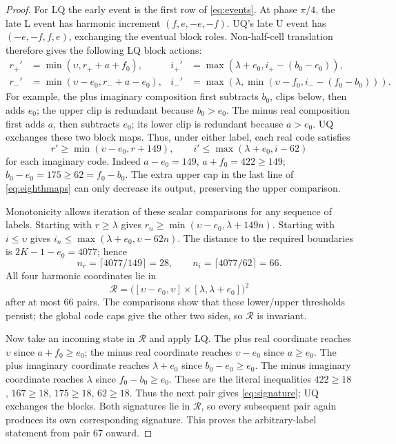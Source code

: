 \begin{proof}
For LQ the early event is the first row of \eqref{eq:events}. At phase $\pi/4$, the late L event has harmonic increment $(f,e,-e,-f)$. UQ's late U event has $(-e,-f,f,e)$, exchanging the eventual block roles. Non-half-cell translation therefore gives the following LQ block actions:
\begin{equation}\label{eq:eighthmaps}
 \begin{aligned}
 r_+'&=\min(\upsilon,r_++a+f_0),&
 i_+'&=\max(\lambda+e_0,i_+-(b_0-e_0)),\\
 r_-'&=\min(\upsilon-e_0,r_-+a-e_0),&
 i_-'&=\max(\lambda,\min(\upsilon-f_0,i_--(f_0-b_0))).
 \end{aligned}
\end{equation}
For example, the plus imaginary composition first subtracts $b_0$, clips below, then adds $e_0$; the upper clip is redundant because $b_0>e_0$. The minus real composition first adds $a$, then subtracts $e_0$; its lower clip is redundant because $a>e_0$. UQ exchanges these two block maps. Thus, under either label, each real code satisfies
\begin{equation}\label{eq:drift}
 r'\ge\min(\upsilon-e_0,r+149),\qquad
 i'\le\max(\lambda+e_0,i-62)
\end{equation}
for each imaginary code. Indeed $a-e_0=149$, $a+f_0=422\ge149$; $b_0-e_0=175\ge62=f_0-b_0$. The extra upper cap in the last line of \eqref{eq:eighthmaps} can only decrease its output, preserving the upper comparison.

Monotonicity allows iteration of these scalar comparisons for any sequence of labels. Starting with $r\ge\lambda$ gives
$r_n\ge\min(\upsilon-e_0,\lambda+149n)$.
Starting with $i\le\upsilon$ gives
$i_n\le\max(\lambda+e_0,\upsilon-62n)$.
The distance to the required boundaries is $2K-1-e_0=4077$; hence
\[
 n_r=\lceil4077/149\rceil=28,\qquad
 n_i=\lceil4077/62\rceil=66 .
\]
All four harmonic coordinates lie in
\begin{equation}\label{eq:rectangle}
 \mathcal R=\bigl([\upsilon-e_0,\upsilon]\times
                         [\lambda,\lambda+e_0]\bigr)^2
\end{equation}
after at most 66 pairs. The comparisons show that these lower/upper thresholds persist; the global code caps give the other two sides, so $\mathcal R$ is invariant.

Now take an incoming state in $\mathcal R$ and apply LQ. The plus real coordinate reaches $\upsilon$ since $a+f_0\ge e_0$; the minus real coordinate reaches $\upsilon-e_0$ since $a\ge e_0$. The plus imaginary coordinate reaches $\lambda+e_0$ since $b_0-e_0\ge e_0$. The minus imaginary coordinate reaches $\lambda$ since $f_0-b_0\ge e_0$. These are the literal inequalities $422\ge18$, $167\ge18$, $175\ge18$, $62\ge18$. Thus the next pair gives \eqref{eq:signature}; UQ exchanges the blocks. Both signatures lie in $\mathcal R$, so every subsequent pair again produces its own corresponding signature. This proves the arbitrary-label statement from pair 67 onward.


\end{proof}
